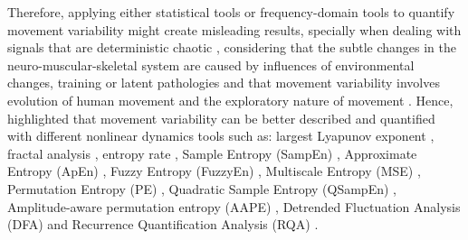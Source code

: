 Therefore, applying either statistical tools or frequency-domain tools 
to quantify movement variability might create misleading results, 
specially when dealing with signals that are deterministic chaotic 
\citep{amato1992, dingwell2000, dingwell2007, miller2006},
considering  
that the subtle changes in the neuro-muscular-skeletal system are caused by 
influences of environmental changes, training or latent 
pathologies \citep{preatoni2010, preatoni2013}
and that movement variability involves evolution of human movement and 
the exploratory nature of movement \citep{stergiou2011, caballero2014}. 
Hence, \cite{stergiou2011, preatoni2010, caballero2014} 
highlighted that movement variability can be better described and quantified 
with different nonlinear dynamics tools such as: 
largest Lyapunov exponent \citep{bruijn2009, donker2007, kurz2010b, 
yang2011},
fractal analysis \citep{delignleres2003},
entropy rate \citep{cavanaugh2010},
Sample Entropy (SampEn)  \citep{richman2000, donker2007, liao2008, 
stins2009, vaillancourt2004},
Approximate Entropy (ApEn) \citep{pincus1991, kurz2010a, sosnoff2006, 
sosnoff2009, cavanaugh2010},
Fuzzy Entropy (FuzzyEn) \citep{chen2007},
Multiscale Entropy (MSE) \citep{costa2002},
Permutation Entropy (PE) \citep{bandt2002, vakharia2015},
Quadratic Sample Entropy (QSampEn) \citep{lake2011},
Amplitude-aware permutation entropy (AAPE) \citep{azami2016},
Detrended Fluctuation Analysis (DFA) \citep{gates2007, gates2008, 
hausdorff200} and 
Recurrence Quantification Analysis (RQA) \citep{zbilut1992, trulla1996, 
marwan2008}.


